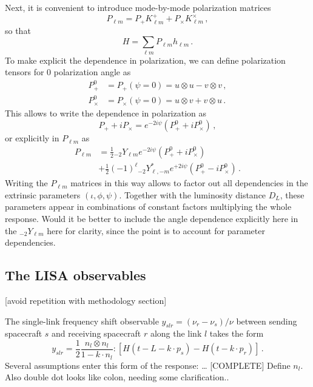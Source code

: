 \documentclass[aps,showpacs,twocolumn,prd,superscriptaddress,nofootinbib]{revtex4-1}
\newcommand{\be}{\begin{equation}}
\newcommand{\ee}{\end{equation}}
\newcommand{\bsub}{\begin{subequations}}
\newcommand{\esub}{\end{subequations}}
\newcommand{\nn}{\nonumber}
\newcommand{\sYlm}{{}_{-2}Y_{\ell m}}
\newcommand{\sYlminusmstar}{{}_{-2}Y_{\ell, -m}^{*}}
\newcommand{\SM}[1]{{\color{Blue} #1}}
\newcommand{\jgb}[1]{{\color{DarkGreen} #1}}
\begin{document}
Next, it is convenient to introduce mode-by-mode polarization matrices
\be
	P_{\ell m} = P_{+} K_{\ell m}^{+} + P_{\times} K_{\ell m}^{\times} \,,
\ee
so that
\be\label{eq:Hsummodes}
	H = \sum_{\ell m} P_{\ell m} h_{\ell m} \,.
\ee
To make explicit the dependence in polarization, we can define polarization tensors for 0 polarization angle as
\bsub
\begin{align}
	P_{+}^{0} &= P_{+}(\psi = 0) = u \otimes u - v \otimes v \,,\\
	P_{\times}^{0} &= P_{\times}(\psi = 0) = u \otimes v + v \otimes u \,.
\end{align}
\esub
This allows to write the dependence in polarization as
\be
	P_{+} + i P_{\times} = e^{-2 i \psi} \left( P_{+}^{0} + i P_{\times}^{0} \right) \,,
\ee
or explicitly in $P_{\ell m}$ as
\begin{align}
	P_{\ell m} &= \frac{1}{2} \sYlm e^{-2 i \psi} \left( P_{+}^{0} + i P_{\times}^{0} \right) \nn\\
	& + \frac{1}{2} (-1)^{\ell} \sYlminusmstar e^{+2 i \psi} \left( P_{+}^{0} - i P_{\times}^{0} \right) \,.
\end{align}
Writing the $P_{\ell m}$ matrices in this way allows to factor out all dependencies in the extrinsic parameters $(\iota, \phi, \psi)$. Together with the luminosity distance $D_{L}$, these parameters appear in combinations of constant factors multiplying the whole response. \jgb{Would it be better to include the angle dependence explicitly here in the $\sYlm$ here for clarity, since the point is to account for parameter dependencies.} 


\subsection{The LISA observables}
\label{sec:LISAobservables}

\SM{[avoid repetition with methodology section]}

The single-link frequency shift observable $y_{slr} = (\nu_{r} - \nu_{s})/\nu$ between sending spacecraft $s$ and receiving spacecraft $r$ along the link $l$ takes the form 
\be\label{eq:appdefyslr}
	y_{slr} = \frac{1}{2} \frac{n_{l} \otimes n_{l}}{1 - k\cdot n_{l}} : \left[ H(t - L - k\cdot p_{s}) - H(t - k\cdot p_{r}) \right] \,.
\ee
Several assumptions enter this form of the response: \dots \SM{[COMPLETE]} \jgb{Define $n_l$. Also double dot looks like colon, needing some clarification.}.
\end{document}
